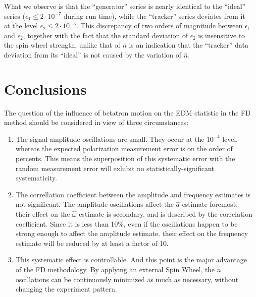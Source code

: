 \documentclass[a4paper]{jacow}
\newcommand{\w}{\omega}
\newcommand{\nbar}{\bar n}
\begin{document}
What we observe is that the ``generator'' series is nearly identical
to the ``ideal'' series ($\epsilon_1 \le 2\cdot10^{-7}$ during run time),
while the ``tracker'' series deviates from it at the level
$\epsilon_2 \le 2\cdot 10^{-5}$. This discrepancy of two
orders of magnitude between $\epsilon_1$ and $\epsilon_2$, together
with the fact that the standard deviation of
$\epsilon_2$ is insensitive to the spin wheel strength, unlike that of
$\nbar$ is an indication that the ``tracker'' data deviation from its ``ideal'' is
not caused by the variation of $\nbar$.

\section{Conclusions}
The question of the influence of betatron motion on the EDM statistic in the FD method should be considered
in view of three circumstances:
\begin{enumerate}
\item The signal amplitude oscillations are small. They occur at the $10^{-4}$ level, whereas the expected
  polarization measurement error is on the order of percents. This means the superposition of this systematic
  error with the random measurement error will exhibit no statistically-significant systematicity.
\item The correllation coefficient between the amplitude and frequency estimates is not significant. The amplitude
  oscillations affect the $\hat a$-estimate foremost; their effect on the $\hat\w$-estimate is secondary, and is
  described by the correlation coefficient. Since it is less than 10\%, even if the oscillations happen to be
  strong enough to affect the amplitude estimate, their effect on the frequency estimate will be reduced by
  at least a factor of 10.
\item This systematic effect is controllable. And this point is the major advantage of the FD methodology.
  By applying an external Spin Wheel, the $\nbar$ oscillations can be continuously minimized
  as much as necessary, without changing the experiment pattern.
\end{enumerate}
\end{document}
